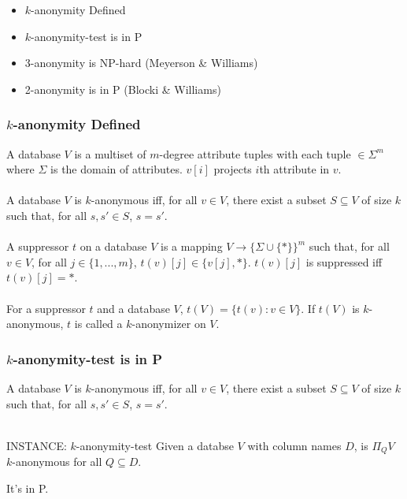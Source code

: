 \documentclass{beamer}
\date{\displaydate{date}}
\begin{document}
\begin{frame}
\begin{itemize}
    \item $k$-anonymity Defined
    \item $k$-anonymity-test is in P
    \item 3-anonymity is NP-hard (Meyerson \& Williams)
    \item 2-anonymity is in P (Blocki \& Williams)
\end{itemize}
\end{frame}

\begin{frame}
\frametitle{$k$-anonymity Defined}
A database $V$ is a multiset of $m$-degree attribute tuples with each tuple $\in \Sigma^{m}$ where $\Sigma$ is the domain of attributes. $v[i]$ projects $i$th attribute in $v$.\\~\\

A database $V$ is $k$-anonymous iff, for all $v \in V$, there exist a subset $S \subseteq V$ of size $k$ such that, for all $s,s' \in S$, $s=s'$.\\~\\

A suppressor $t$ on a database $V$ is a mapping $V \rightarrow \{\Sigma \cup \{*\}\}^{m}$ such that, for all $v \in V$, for all $j \in \{1,...,m\}$, $t(v)[j] \in \{v[j], *\}$. $t(v)[j]$ is suppressed iff $t(v)[j] = *$.\\~\\

For a suppressor $t$ and a database $V$, $t(V) = \{t(v) : v \in V\}$. If $t(V)$ is $k$-anonymous, $t$ is called a $k$-anonymizer on $V$.
\end{frame}

\begin{frame}
\frametitle{$k$-anonymity-test is in P}
A database $V$ is $k$-anonymous iff, for all $v \in V$, there exist a subset $S \subseteq V$ of size $k$ such that, for all $s,s' \in S$, $s=s'$.\\~\\

\begin{block}{INSTANCE: $k$-anonymity-test}
Given a databse $V$ with column names $D$, is $\Pi_{Q} V$ $k$-anonymous for all $Q \subseteq D$.
\end{block}

It's in P.
\end{frame}
\end{document}
